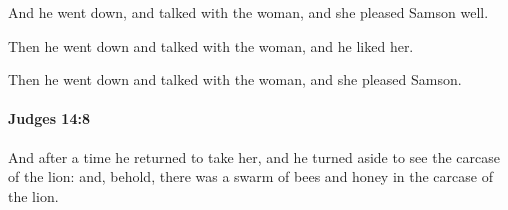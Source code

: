 			\begin{versebox}
					\item[BHS] 
					\item[ASV] And he went down, and talked with the woman, and she pleased Samson well.
					\item[NIV] Then he went down and talked with the woman, and he liked her.
					\item[NRSV] Then he went down and talked with the woman, and she pleased Samson.
			\end{versebox}

		\paragraph{Judges 14:8} %
			\label{JUDGES-14-8}

			And after a time he returned to take her, and he turned aside to see the carcase of the lion: and, behold, there was a swarm of bees and honey in the carcase of the lion.

